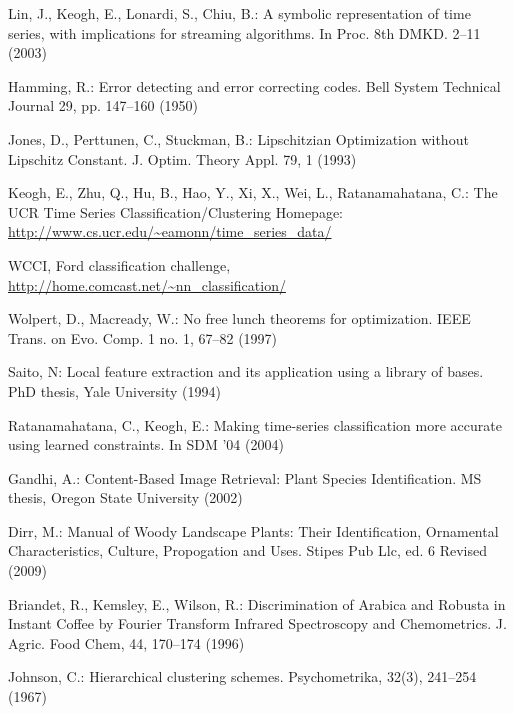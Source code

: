 \documentclass[conference]{IEEEtran}
\begin{document}
\begin{thebibliography}{5}
Lin, J., Keogh, E., Lonardi, S., Chiu, B.:
A symbolic representation of time series, with implications for streaming algorithms. 
In Proc. 8th DMKD. 2--11 (2003)

Hamming, R.:
Error detecting and error correcting codes. 
Bell System Technical Journal 29, pp. 147--160 (1950)


Jones, D., Perttunen, C., Stuckman, B.:
Lipschitzian Optimization without Lipschitz Constant.
J. Optim. Theory Appl. 79, 1 (1993)

Keogh, E., Zhu, Q., Hu, B., Hao, Y.,  Xi, X., Wei, L., Ratanamahatana, C.:
The UCR Time Series Classification/Clustering Homepage:
\url{http://www.cs.ucr.edu/~eamonn/time_series_data/}

WCCI, Ford classification challenge,
\url{http://home.comcast.net/~nn_classification/}

Wolpert, D., Macready, W.:
No free lunch theorems for optimization.
IEEE Trans. on Evo. Comp. 1 no. 1, 67--82 (1997)

Saito, N:
Local feature extraction and its application using a library of bases. 
PhD thesis, Yale University (1994)


Ratanamahatana, C., Keogh, E.:
Making time-series classification more accurate using learned constraints. 
In SDM '04 (2004)

Gandhi, A.:
Content-Based Image Retrieval: Plant Species Identification. 
MS thesis, Oregon State University (2002)

Dirr, M.:
Manual of Woody Landscape Plants: Their Identification, Ornamental Characteristics,
Culture, Propogation and Uses.
Stipes Pub Llc, ed. 6 Revised (2009)

Briandet, R., Kemsley, E., Wilson, R.:
Discrimination of Arabica and Robusta in Instant Coffee by Fourier Transform Infrared Spectroscopy
and Chemometrics.
J. Agric. Food Chem, 44, 170--174 (1996)

Johnson, C.:
Hierarchical clustering schemes.
Psychometrika, 32(3), 241--254 (1967)


\end{thebibliography}
\end{document}
